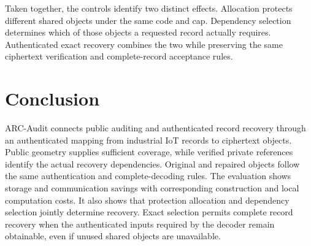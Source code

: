 \documentclass[10pt,journal]{IEEEtran}
\begin{document}
Taken together, the controls identify two distinct effects. Allocation
protects different shared objects under the same code and cap. Dependency
selection determines which of those objects a requested record actually
requires. Authenticated exact recovery combines the two while preserving
the same ciphertext verification and complete-record acceptance rules.

\section{Conclusion}
ARC-Audit connects public auditing and authenticated record recovery through
an authenticated mapping from industrial IoT records to ciphertext objects.
Public geometry supplies sufficient coverage, while verified private references
identify the actual recovery dependencies. Original and repaired objects follow
the same authentication and complete-decoding rules. The evaluation shows
storage and communication savings with corresponding construction and local
computation costs. It also shows that protection allocation and dependency
selection jointly determine recovery. Exact selection permits complete
record recovery when the authenticated inputs required by the decoder remain
obtainable, even if unused shared objects are unavailable.



\end{document}
